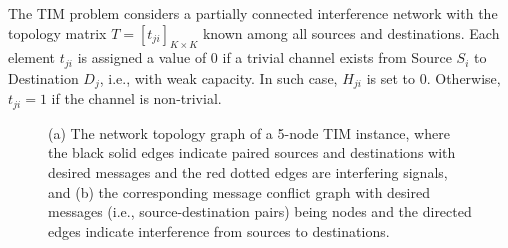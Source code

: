 \documentclass[a4paper,journal]{IEEEtran}
\begin{document}
The TIM problem \cite{jafar2013topological} considers a partially connected interference network with the topology matrix $T = [t_{ji}]_{K\times K}$ known among all sources and destinations. Each element $t_{ji}$ is assigned a value of $0$ if a trivial channel exists from Source $S_i$ to Destination $D_j$, i.e., with weak capacity. In such case, $H_{ji}$ is set to $0$. Otherwise, $t_{ji} = 1$ if the channel is non-trivial.
\begin{comment}
    In this subsection, the target could be the formulation of the received signal. I am somewhat concerned about the explanation. We demonstrate that the non-zero channel will be considered, but indeed, it should be the significant channel that is considered. Additionally, I remembered, we use the significant channel to generate the wireless network graph in the simulation result section.
\end{comment}
\begin{figure}[htbp]
   \centering
   \vspace{-20pt}
   \hfil
   \caption{(a) The network topology graph of a 5-node TIM instance, where the black solid edges indicate paired sources and destinations with desired messages and the red dotted edges are interfering signals, and (b) the corresponding message conflict graph with desired messages (i.e., source-destination pairs) being nodes and the directed edges indicate interference from sources to destinations.}
   \label{5_nodes_sample}
\end{figure}
\end{document}
